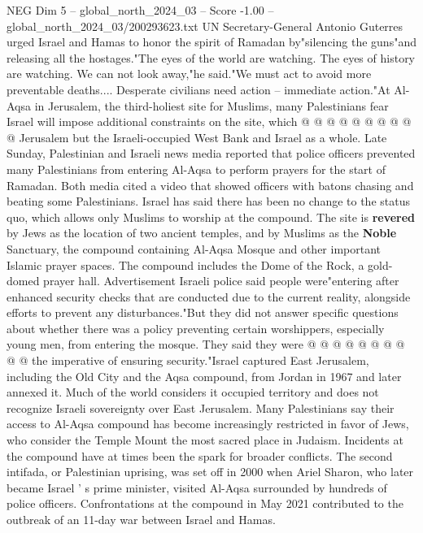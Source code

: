 \begin{textsample}{NEG Dim 5 – global\_north\_2024\_03 – Score -1.00 – global\_north\_2024\_03/200293623.txt}
UN Secretary-General Antonio Guterres urged Israel and Hamas to honor the spirit of Ramadan by"silencing the guns"and releasing all the hostages."The eyes of the world are watching.
The eyes of history are watching.
We can not look away,"he said."We must act to avoid more preventable deaths....
Desperate civilians need action -- immediate action."At Al-Aqsa in Jerusalem, the third-holiest site for Muslims, many Palestinians fear Israel will impose additional constraints on the site, which @ @ @ @ @ @ @ @ @ @ Jerusalem but the Israeli-occupied West Bank and Israel as a whole.
Late Sunday, Palestinian and Israeli news media reported that police officers prevented many Palestinians from entering Al-Aqsa to perform prayers for the start of Ramadan.
Both media cited a video that showed officers with batons chasing and beating some Palestinians.
Israel has said there has been no change to the status quo, which allows only Muslims to worship at the compound.
The site is \textbf{revered} by Jews as the location of two ancient temples, and by Muslims as the \textbf{Noble} Sanctuary, the compound containing Al-Aqsa Mosque and other important Islamic prayer spaces.
The compound includes the Dome of the Rock, a gold-domed prayer hall.
Advertisement Israeli police said people were"entering after enhanced security checks that are conducted due to the current reality, alongside efforts to prevent any disturbances."But they did not answer specific questions about whether there was a policy preventing certain worshippers, especially young men, from entering the mosque.
They said they were @ @ @ @ @ @ @ @ @ @ the imperative of ensuring security."Israel captured East Jerusalem, including the Old City and the Aqsa compound, from Jordan in 1967 and later annexed it.
Much of the world considers it occupied territory and does not recognize Israeli sovereignty over East Jerusalem.
Many Palestinians say their access to Al-Aqsa compound has become increasingly restricted in favor of Jews, who consider the Temple Mount the most sacred place in Judaism.
Incidents at the compound have at times been the spark for broader conflicts.
The second intifada, or Palestinian uprising, was set off in 2000 when Ariel Sharon, who later became Israel ' s prime minister, visited Al-Aqsa surrounded by hundreds of police officers.
Confrontations at the compound in May 2021 contributed to the outbreak of an 11-day war between Israel and Hamas.

\end{textsample}
